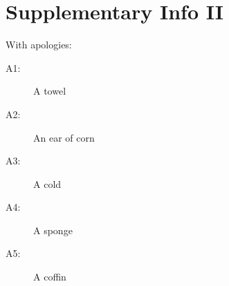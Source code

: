 \chapter{Supplementary Info II}
\label{apdx:supplementaryInfoII}

With apologies:

\begin{description} 
    \item[A1:] A towel
    \item[A2:] An ear of corn
	\item[A3:] A cold
	\item[A4:] A sponge
	\item[A5:] A coffin
\end{description} 